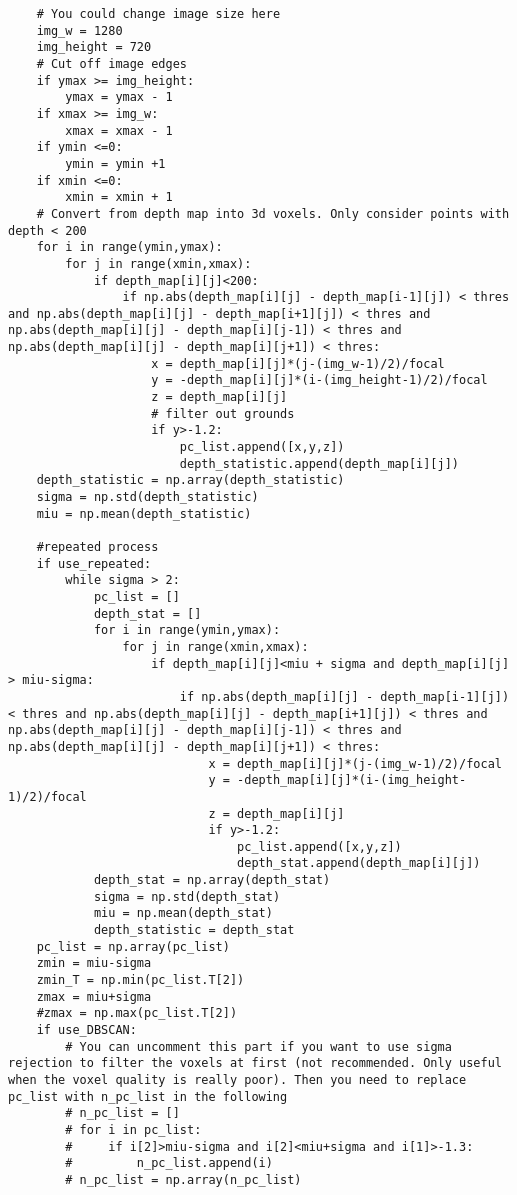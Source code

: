 \begin{lstlisting}
    # You could change image size here
    img_w = 1280
    img_height = 720
    # Cut off image edges
    if ymax >= img_height:
        ymax = ymax - 1
    if xmax >= img_w:
        xmax = xmax - 1
    if ymin <=0:
        ymin = ymin +1
    if xmin <=0:
        xmin = xmin + 1
    # Convert from depth map into 3d voxels. Only consider points with depth < 200
    for i in range(ymin,ymax):
        for j in range(xmin,xmax):
            if depth_map[i][j]<200:
                if np.abs(depth_map[i][j] - depth_map[i-1][j]) < thres and np.abs(depth_map[i][j] - depth_map[i+1][j]) < thres and np.abs(depth_map[i][j] - depth_map[i][j-1]) < thres and np.abs(depth_map[i][j] - depth_map[i][j+1]) < thres:
                    x = depth_map[i][j]*(j-(img_w-1)/2)/focal
                    y = -depth_map[i][j]*(i-(img_height-1)/2)/focal
                    z = depth_map[i][j]
                    # filter out grounds
                    if y>-1.2:
                        pc_list.append([x,y,z])
                        depth_statistic.append(depth_map[i][j])
    depth_statistic = np.array(depth_statistic)
    sigma = np.std(depth_statistic)
    miu = np.mean(depth_statistic)

    #repeated process
    if use_repeated:
        while sigma > 2:
            pc_list = []
            depth_stat = []
            for i in range(ymin,ymax):
                for j in range(xmin,xmax):
                    if depth_map[i][j]<miu + sigma and depth_map[i][j] > miu-sigma:
                        if np.abs(depth_map[i][j] - depth_map[i-1][j]) < thres and np.abs(depth_map[i][j] - depth_map[i+1][j]) < thres and np.abs(depth_map[i][j] - depth_map[i][j-1]) < thres and np.abs(depth_map[i][j] - depth_map[i][j+1]) < thres:
                            x = depth_map[i][j]*(j-(img_w-1)/2)/focal
                            y = -depth_map[i][j]*(i-(img_height-1)/2)/focal
                            z = depth_map[i][j]
                            if y>-1.2:
                                pc_list.append([x,y,z])
                                depth_stat.append(depth_map[i][j])
            depth_stat = np.array(depth_stat)
            sigma = np.std(depth_stat)
            miu = np.mean(depth_stat)
            depth_statistic = depth_stat
    pc_list = np.array(pc_list)
    zmin = miu-sigma
    zmin_T = np.min(pc_list.T[2])
    zmax = miu+sigma
    #zmax = np.max(pc_list.T[2])
    if use_DBSCAN:
        # You can uncomment this part if you want to use sigma rejection to filter the voxels at first (not recommended. Only useful when the voxel quality is really poor). Then you need to replace pc_list with n_pc_list in the following
        # n_pc_list = []
        # for i in pc_list:
        #     if i[2]>miu-sigma and i[2]<miu+sigma and i[1]>-1.3:
        #         n_pc_list.append(i)
        # n_pc_list = np.array(n_pc_list)


\end{lstlisting}
